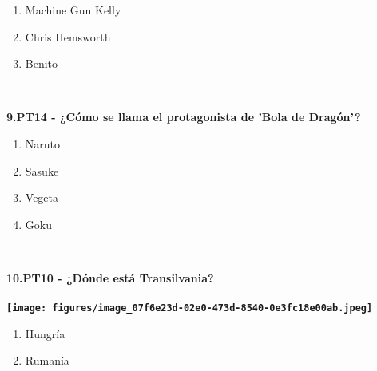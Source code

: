 \documentclass[12pt,a4paper,twoside]{article}
\begin{document}
{{		}
		\begin{enumerate}[label=\Alph*., itemsep=0.02em]
			\small\item Machine Gun Kelly\small\item Chris Hemsworth\small\item Benito
		\end{enumerate}
		}\vspace{1\baselineskip}\\\noindent\parbox[t]{0.9\textwidth}{
		\textbf{
            \small
			9.PT14 - ¿Cómo se llama el protagonista de 'Bola de Dragón'?
		}
		\begin{enumerate}[label=\Alph*., itemsep=0.02em]
			\small\item Naruto\small\item Sasuke\small\item Vegeta\small\item Goku
		\end{enumerate}
		}\vspace{1\baselineskip}\\\noindent\parbox[t]{0.9\textwidth}{
		\textbf{
            \small
			10.PT10 - ¿Dónde está Transilvania?﻿\\\\ \texttt{[image: figures/image\_07f6e23d-02e0-473d-8540-0e3fc18e00ab.jpeg]}
		}
		\begin{enumerate}[label=\Alph*., itemsep=0.02em]
			\small\item Hungría\small\item Rumanía
		\end{enumerate}
		}
 
	

	
\end{document}
